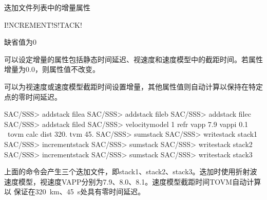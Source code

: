 \label{sss:incrementstack}

迭加文件列表中的增量属性

\begin{SACSTX}
I!NCREMENT!S!TACK!
\end{SACSTX}

缺省值为0

可以设定增量的属性包括静态时间延迟、视速度和速度模型中的截距时间。若属性
增量为0.0，则属性值不改变。

可以为视速度或速度模型截距时间设置增量，其他属性值则自动计算以保持在特定点的零时间延迟。

\begin{SACCode}
SAC/SSS> addstack filea
SAC/SSS> addstack fileb
SAC/SSS> addstack filec
SAC/SSS> addstack filed
SAC/SSS> velocitymodel 1 refr vapp 7.9 vappi 0.1 \
                        tovm calc dist 320. tvm 45.
SAC/SSS> sumstack
SAC/SSS> writestack stack1
SAC/SSS> incrementstack
SAC/SSS> sumstack
SAC/SSS> writestack stack2
SAC/SSS> incrementstack
SAC/SSS> sumstack
SAC/SSS> writestack stack3
\end{SACCode}

上面的命令会产生三个迭加文件，即stack1、stack2、stack3。迭加时使用折射波
速度模型，视速度VAPP分别为7.9、8.0、8.1。速度模型截距时间TOVM自动计算以
保证在\SI{320}{\km}、\SI{45}{\s}处具有零时间延迟。

